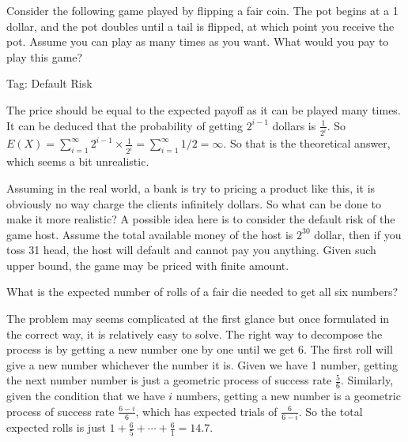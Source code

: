 \begin{exe}
Consider the following game played by flipping a fair coin. The pot begins at a 1 dollar, and the pot doubles until a tail is flipped, at which point you receive the pot. Assume you can play as many times as you want. What would you pay to play this game?
\end{exe}
\begin{teacher}
Tag: Default Risk
\begin{sol}
The price should be equal to the expected payoff as it can be played many times. It can be deduced that the probability of getting $2^{i-1}$ dollars is $\frac{1}{2^i}$. So $E(X) = \sum_{i=1}^{\infty} 2^{i-1}\times\frac{1}{2^i}=\sum_{i=1}^{\infty} 1/2=\infty$. So that is the theoretical answer, which seems a bit unrealistic.

Assuming in the real world, a bank is try to pricing a product like this, it is obviously no way charge the clients infinitely dollars. So what can be done to make it more realistic? A possible idea here is to consider the default risk of the game host. Assume the total available money of the host is $2^30$ dollar, then if you toss 31 head, the host will default and cannot pay you anything. Given such upper bound, the game may be priced with finite amount.
\end{sol}
\end{teacher}

\begin{exe}
What is the expected number of rolls of a fair die needed to get all six numbers?
\end{exe}
\begin{teacher}
\begin{sol}
The problem may seems complicated at the first glance but once formulated in the correct way, it is relatively easy to solve. The right way to decompose the process is by getting a new number one by one until we get 6. The first roll will give a new number whichever the number it is. Given we have 1 number, getting the next number number is just a geometric process of success rate $\frac{5}{6}$. Similarly, given the condition that we have $i$ numbers, getting a new number is a geometric process of success rate $\frac{6-i}{6}$, which has expected trials of $\frac{6}{6-i}$. So the total expected rolls is just $1+\frac{6}{5}+\cdots+\frac{6}{1}=14.7$.
\end{sol}
\end{teacher}

